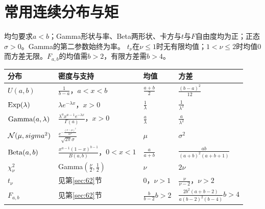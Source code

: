 \section{常用连续分布与矩}
均匀要求$a<b$；Gamma形状与率、Beta两形状、卡方与$t\text{与}F$自由度均为正；正态$\sigma>0$。Gamma的第二参数始终为率。
$t_\nu$在$\nu\le1$时无有限均值；$1<\nu\le2$时均值0而方差无限。$F_{a,b}$的均值需$b>2$，有限方差需$b>4$。
\small
\begin{longtable}{@{}p{}p{}p{}p{}@{}}\toprule
分布&密度与支持&均值&方差\\\midrule\endhead
$U(a,b)$&$\frac{1}{b-a}$，$a<x<b$&$\frac{a+b}{2}$&$\frac{(b-a)^2}{12}$\\
$\operatorname{Exp}(\lambda)$&$\lambda e^{-\lambda x}$，$x>0$&$\frac{1}{\lambda}$&$\frac{1}{\lambda^2}$\\
$\operatorname{Gamma}(a,\lambda)$&$\frac{\lambda^ax^{a-1}e^{-\lambda x}}{\Gamma(a)}$，$x>0$&$\frac{a}{\lambda}$&$\frac{a}{\lambda^2}$\\
$\mathcal N(\mu,sigma^2)$&$\frac{e^{-\frac{(x-\mu)^2}{2\sigma^2}}}{\sqrt{2\pi}\sigma}$&$\mu$&$\sigma^2$\\
$\operatorname{Beta}(a,b)$&$\frac{x^{a-1}(1-x)^{b-1}}{B(a,b)}$，$0<x<1$&$\frac{a}{a+b}$&$\frac{ab}{(a+b)^2(a+b+1)}$\\
$\chi_\nu^2$&Gamma$(\frac{\nu}{2},\frac{1}{2})$&$\nu$&$2\nu$\\
$t_\nu$&见第\ref{sec:62}节&0，$\nu>1$&$\frac{\nu}{\nu-2}$，$\nu>2$\\
$F_{a,b}$&见第\ref{sec:62}节&$\frac{b}{b-2}$\newline $b>2$&$\frac{2b^2(a+b-2)}{a(b-2)^2(b-4)}$\newline $b>4$\\\bottomrule
\end{longtable}\normalsize
